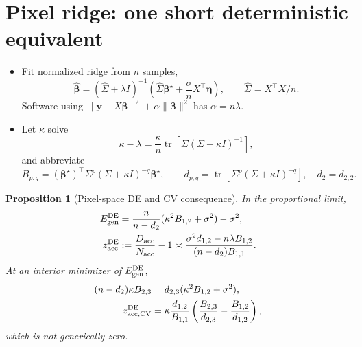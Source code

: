\documentclass{article}
\newtheorem{proposition}[theorem]{Proposition}
\providecommand{\tr}{\operatorname{tr}}
\newcommand{\bhat}{\widehat{\bm\beta}}
\newcommand{\bstar}{\bm\beta^{\star}}
\newcommand{\Egen}{E_{\rm gen}}
\begin{document}
\section{Pixel ridge: one short deterministic equivalent}
\label{sec:pixel}

\begin{itemize}[leftmargin=1.3em]
  \item Fit normalized ridge from $n$ samples,
  \begin{equation}
    \bhat=(\widehat\Sigma+\lambda I)^{-1}
      \left(\widehat\Sigma\bstar+\frac{\sigma}{n}X^\top\bm\eta\right),
    \qquad \widehat\Sigma=X^\top X/n.
    \label{eq:ridge}
  \end{equation}
  Software using $\lVert\bm y-X\bm\beta\rVert^2+\alpha\lVert\bm\beta\rVert^2$
  has $\alpha=n\lambda$.
  \item Let $\kappa$ solve
  \begin{equation}
    \kappa-\lambda=\frac{\kappa}{n}
      \tr\!\left[\Sigma(\Sigma+\kappa I)^{-1}\right],
    \label{eq:kappa}
  \end{equation}
  and abbreviate
  \begin{equation}
    B_{p,q}=(\bstar)^\top\Sigma^p(\Sigma+\kappa I)^{-q}\bstar,
    \qquad d_{p,q}=\tr[\Sigma^p(\Sigma+\kappa I)^{-q}],
    \quad d_2=d_{2,2}.
    \label{eq:summaries}
  \end{equation}
\end{itemize}

\begin{proposition}[Pixel-space DE and CV consequence]
\label{prop:pixel}
In the proportional limit,
\begin{align}
  \Egen^{\rm DE}
  &=\frac{n}{n-d_2}(\kappa^2B_{1,2}+\sigma^2)-\sigma^2,
  \label{eq:egen-de}\\
  z_{\rm acc}^{\rm DE}
  &:=\frac{D_{\rm acc}}{N_{\rm acc}}-1
  \asymp
  \frac{\sigma^2d_{1,2}-n\lambda B_{1,2}}
       {(n-d_2)B_{1,1}}.
  \label{eq:z-de}
\end{align}
At an interior minimizer of $\Egen^{\rm DE}$,
\begin{align}
  (n-d_2)\kappa B_{2,3}
  &=d_{2,3}(\kappa^2B_{1,2}+\sigma^2),
  \label{eq:cv-condition}\\
  z_{\rm acc,CV}^{\rm DE}
  &=\kappa\frac{d_{1,2}}{B_{1,1}}
    \left(\frac{B_{2,3}}{d_{2,3}}-
                \frac{B_{1,2}}{d_{1,2}}\right),
  \label{eq:cv-z}
\end{align}
which is not generically zero.
\end{proposition}
\end{document}
